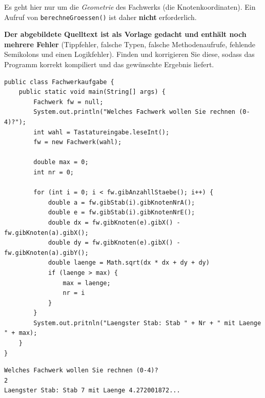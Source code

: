 \documentclass[
	fontsize=12pt,          %
	paper=a4,               %
	numbers=noenddot,       %
	listof=totoc,           %
	listof=entryprefix,     %
	listof=nochaptergap,    %
	bibliography=totoc,     %
	parskip=half            %
	openany                 %
]{scrbook}
\begin{document}
\begin{hinweis}[Wichtig]
	Es geht hier nur um die \emph{Geometrie} des Fachwerks (die Knotenkoordinaten).
	Ein Aufruf von \texttt{berechneGroessen()} ist daher \textbf{nicht} erforderlich.
\end{hinweis}

\bigskip
\textbf{Der abgebildete Quelltext ist als Vorlage gedacht und enthält noch mehrere Fehler} (Tipp\-fehler, falsche Typen, falsche Methodenaufrufe, fehlende Semikolons und einen Logikfehler).
Finden und korrigieren Sie diese, sodass das Programm korrekt kompiliert und das gewünschte Ergebnis liefert.

\begin{lstlisting}
public class Fachwerkaufgabe {
    public static void main(String[] args) {
        Fachwerk fw = null;
        System.out.println("Welches Fachwerk wollen Sie rechnen (0-4)?");
        int wahl = Tastatureingabe.leseInt();
        fw = new Fachwerk(wahl);

        double max = 0;
        int nr = 0;

        for (int i = 0; i < fw.gibAnzahllStaebe(); i++) {
            double a = fw.gibStab(i).gibKnotenNrA();
            double e = fw.gibStab(i).gibKnotenNrE();
            double dx = fw.gibKnoten(e).gibX() - fw.gibKnoten(a).gibX();
            double dy = fw.gibKnoten(e).gibX() - fw.gibKnoten(a).gibY();
            double laenge = Math.sqrt(dx * dx + dy + dy)
            if (laenge > max) {
                max = laenge;
                nr = i
            }
        }
        System.out.pritnln("Laengster Stab: Stab " + Nr + " mit Laenge " + max);
    }
}
\end{lstlisting}

\begin{beispiel}
\begin{verbatim}
Welches Fachwerk wollen Sie rechnen (0-4)?
2
Laengster Stab: Stab 7 mit Laenge 4.272001872...
\end{verbatim}
\end{beispiel}
\end{document}
